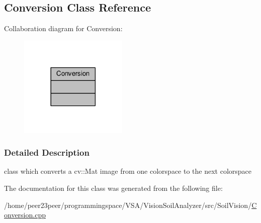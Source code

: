 \hypertarget{class_conversion}{}\subsection{Conversion Class Reference}
\label{class_conversion}


Collaboration diagram for Conversion\+:
\nopagebreak
\begin{figure}[H]
\begin{center}
\leavevmode
\includegraphics[width=146pt]{class_conversion__coll__graph}
\end{center}
\end{figure}


\subsubsection{Detailed Description}
class which converts a cv\+::\+Mat image from one colorspace to the next colorspace 

The documentation for this class was generated from the following file\+:\begin{DoxyCompactItemize}
\item 
/home/peer23peer/programmingspace/\+V\+S\+A/\+Vision\+Soil\+Analyzer/src/\+Soil\+Vision/\hyperlink{_conversion_8cpp}{Conversion.\+cpp}\end{DoxyCompactItemize}
